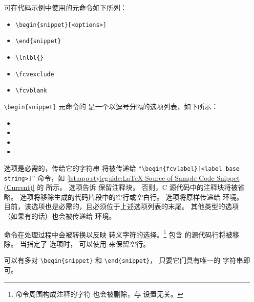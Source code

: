 可在代码示例中使用的元命令如下所列：

\begin{itemize}[noitemsep]
\item \texttt{\textbackslash begin\{snippet\}[<options>]}
\item \texttt{\textbackslash end\{snippet\}}
\item \texttt{\textbackslash lnlbl\{<label string>\}}
\item \texttt{\textbackslash fcvexclude}
\item \texttt{\textbackslash fcvblank}
\end{itemize}

\texttt{\textbackslash begin\{snippet\}} 元命令的 
是一个以逗号分隔的选项列表，如下所示：

\begin{itemize}[noitemsep]
\item {}
\item {}
\item {}
\item {}
\end{itemize}

 选项是必需的，传给它的字符串
将被传递给
``\texttt{\textbackslash begin\{fcvlabel\}[<label base string>]}'' 命令，如
\cref{lst:app:styleguide:LaTeX Source of Sample Code Snippet (Current)} 的
 所示。
 选项告诉  保留注释块。
否则，C 源代码中的注释块将被省略。
 选项将移除生成的代码片段中的空行或空白行。
 选项将原样传递给  环境。
目前，该选项也是必需的，且必须位于上述选项列表的末尾。
其他类型的选项（如果有的话）也会被传递给 
环境。

\qco{\\lnlbl} 命令在处理过程中会被转换以反映
转义字符的选择。\footnote{
	\qco{\\lnlbl} 命令周围构成注释的字符
	也会被删除，与  设置无关。
}
包含 \qco{\\fcvexclude} 的源代码行将被移除。
当指定了  选项时，
可以使用 \qco{\\fcvblank} 来保留空行。

可以有多对 \texttt{\textbackslash begin\{snippet\}} 和 \texttt{\textbackslash end\{snippet\}}，
只要它们具有唯一的  字符串即可。

